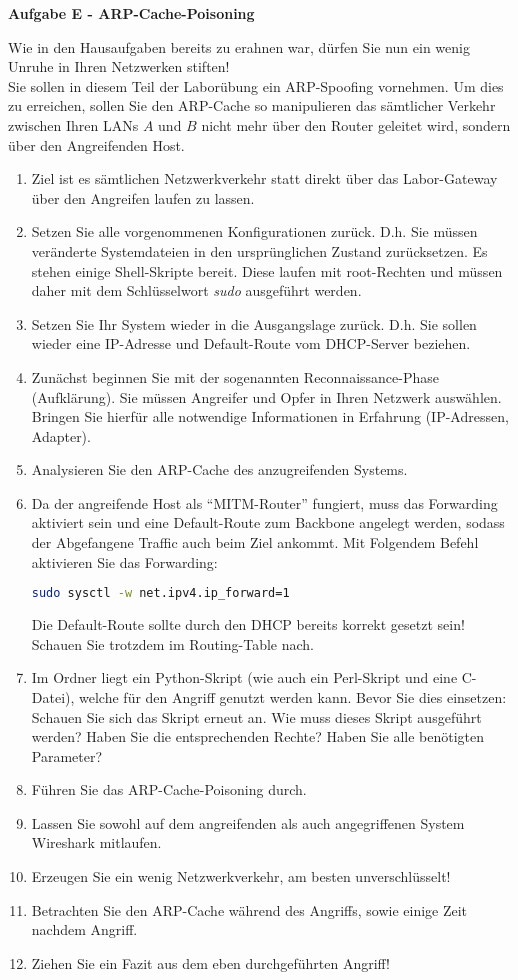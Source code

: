 \documentclass[paper=a4,fontsize=11pt]{scrartcl}%
\numberwithin{equation}{section}
\begin{document}
\begin{center}
\Large{\textbf{Aufgabe E - ARP-Cache-Poisoning}}
\end{center}\vskip0.25in
Wie in den Hausaufgaben bereits zu erahnen war, dürfen Sie nun ein wenig Unruhe in Ihren Netzwerken stiften!\\
Sie sollen in diesem Teil der Laborübung ein ARP-Spoofing vornehmen. Um dies zu erreichen, sollen Sie den ARP-Cache so manipulieren das sämtlicher Verkehr zwischen Ihren LANs $A$ und $B$ nicht mehr über den Router geleitet wird, sondern über den Angreifenden Host.
\begin{enumerate}
	\item Ziel ist es sämtlichen Netzwerkverkehr statt direkt über das Labor-Gateway über den Angreifen laufen zu lassen. 
	\item Setzen Sie alle vorgenommenen Konfigurationen zurück. D.h. Sie müssen veränderte Systemdateien in den ursprünglichen Zustand zurücksetzen. Es stehen einige Shell-Skripte bereit. Diese laufen mit root-Rechten und müssen daher mit dem Schlüsselwort \emph{sudo} ausgeführt werden.
	\item Setzen Sie Ihr System wieder in die Ausgangslage zurück. D.h. Sie sollen wieder eine IP-Adresse und Default-Route vom DHCP-Server beziehen.
	\item Zunächst beginnen Sie mit der sogenannten Reconnaissance-Phase (Aufklärung). Sie
	müssen Angreifer und Opfer in Ihren Netzwerk auswählen. Bringen Sie hierfür alle notwendige Informationen in Erfahrung (IP-Adressen, Adapter).
	\item Analysieren Sie den ARP-Cache des anzugreifenden Systems.
	\item Da der angreifende Host als \enquote{MITM-Router} fungiert, muss das Forwarding aktiviert sein und eine Default-Route zum Backbone angelegt werden, sodass der Abgefangene Traffic auch beim Ziel ankommt. Mit Folgendem Befehl aktivieren Sie das Forwarding:
	\begin{lstlisting}[style=Bash, language=Bash]
sudo sysctl -w net.ipv4.ip_forward=1
\end{lstlisting}
Die Default-Route sollte durch den DHCP bereits korrekt gesetzt sein! Schauen Sie trotzdem im Routing-Table nach.
	\item Im Ordner  liegt ein Python-Skript (wie auch ein Perl-Skript und eine C-Datei), welche für den Angriff genutzt werden kann. Bevor Sie dies einsetzen: Schauen Sie sich das Skript erneut an. Wie muss dieses Skript ausgeführt werden? Haben Sie die entsprechenden Rechte? Haben Sie alle benötigten Parameter?
	\item Führen Sie das ARP-Cache-Poisoning durch.
	\item Lassen Sie sowohl auf dem angreifenden als auch angegriffenen System Wireshark mitlaufen.
	\item Erzeugen Sie ein wenig Netzwerkverkehr, am besten unverschlüsselt!
	\item Betrachten Sie den ARP-Cache während des Angriffs, sowie einige Zeit nachdem Angriff.
	\item Ziehen Sie ein Fazit aus dem eben durchgeführten Angriff!
\end{enumerate}
\end{document}
